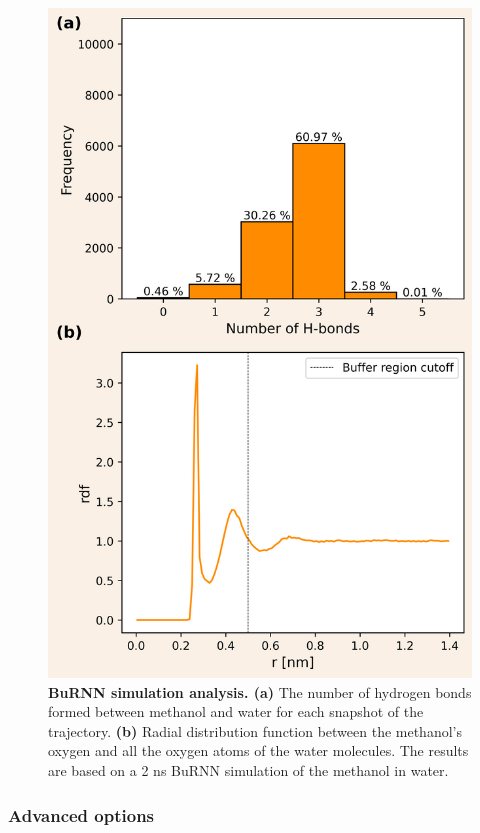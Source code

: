 \begin{figure}[H]
\centering
\includegraphics[scale=.66]{../09_tutorial_06/figures/BuRNN_ana.png}
\caption{\textbf{BuRNN simulation analysis. (a)} The number of hydrogen bonds formed between methanol and water for each snapshot of the trajectory. \textbf{(b)} Radial distribution function between the methanol's oxygen and all the oxygen atoms of the water molecules. The results are based on a 2 ns BuRNN simulation of the methanol in water.}
\label{BuRNN_ana}
\end{figure}



\subsubsection{Advanced options}
